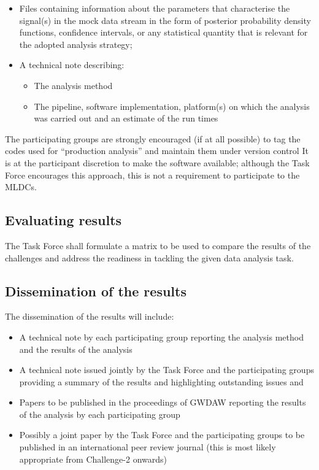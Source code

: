 \documentclass[11pt]{report}
\begin{document}
\begin{itemize}

\item Files containing information about the parameters that characterise the signal(s) in the mock data stream in the form of posterior probability density functions, confidence intervals, or any statistical quantity that is relevant for the adopted analysis strategy;

\item A technical note describing:
\begin{itemize}
\item The analysis method
\item The pipeline, software implementation, platform(s) on which the analysis was carried out and an estimate of the run times
\end{itemize}
\end{itemize}

The participating groups are strongly encouraged (if at all possible) to tag the codes used for ``production analysis'' and maintain them under version control
It is at the participant discretion to make the software available; although the Task Force encourages this approach, this is not a requirement to participate to the MLDCs.

\subsection{Evaluating results}

The Task Force shall formulate a matrix to be used to compare the results of the challenges and address the readiness in tackling the given data analysis task. 

\subsection{Dissemination of the results}

The dissemination of the results will include:
\begin{itemize}

\item A technical note by each participating group reporting the analysis method and the results of the analysis

\item A technical note issued jointly by the Task Force and the participating groups providing a summary of the results and highlighting outstanding issues and

\item Papers to be published in the proceedings of GWDAW reporting the results of the analysis by each participating group

\item Possibly a joint paper by the Task Force and the participating groups to be published in an international peer review journal (this is most likely appropriate from Challenge-2 onwards)

\end{itemize}
\end{document}
